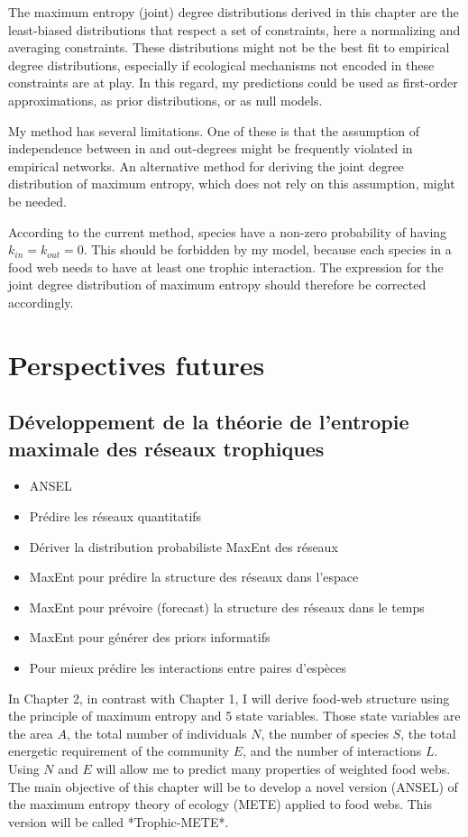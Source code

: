 The maximum entropy (joint) degree distributions derived in this chapter are the
least-biased distributions that respect a set of constraints, here a normalizing
and averaging constraints. These distributions might not be the best fit to
empirical degree distributions, especially if ecological mechanisms not encoded
in these constraints are at play. In this regard, my predictions could be used
as first-order approximations, as prior distributions, or as null models.

My method has several limitations. One of these is that the assumption of
independence between in and out-degrees might be frequently violated in
empirical networks. An alternative method for deriving the joint degree
distribution of maximum entropy, which does not rely on this assumption, might
be needed. 

According to the current
method, species have a non-zero probability of having $k_{in} = k_{out} = 0$.
This should be forbidden by my model, because each species in a food web needs
to have at least one trophic interaction. The expression for the joint degree
distribution of maximum entropy should therefore be corrected accordingly.

\section{Perspectives futures}

\subsection{Développement de la théorie de l'entropie maximale des réseaux trophiques} 

\begin{itemize}
    \item ANSEL 
    \item Prédire les réseaux quantitatifs
    \item Dériver la distribution probabiliste MaxEnt des réseaux
    \item MaxEnt pour prédire la structure des réseaux dans l'espace
    \item MaxEnt pour prévoire (forecast) la structure des réseaux dans le temps
    \item MaxEnt pour générer des priors informatifs 
    \item Pour mieux prédire les interactions entre paires d'espèces
\end{itemize}

In Chapter 2, in contrast with Chapter 1, I will derive food-web structure using
the principle of maximum entropy and 5 state variables. Those state variables
are the area $A$, the total number of individuals $N$, the number of species
$S$, the total energetic requirement of the community $E$, and the number of
interactions $L$. Using $N$ and $E$ will allow me to predict many properties of
weighted food webs. The main objective of this chapter will be to develop a
novel version (ANSEL) of the maximum entropy theory of ecology (METE) applied to
food webs. This version will be called *Trophic-METE*.

